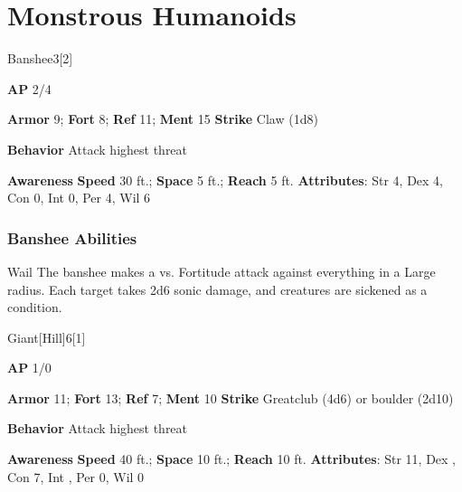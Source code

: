 \section{Monstrous Humanoids}
\begin{monsection}{Banshee}{3}[2]
\vspace{-1em}\vspace{-1em}
\begin{spellcontent}
\begin{spelltargetinginfo}
{\textbf{AP} 2/4}

\pari \textbf{Armor} 9;
\textbf{Fort} 8;
\textbf{Ref} 11;
\textbf{Ment} 15
\pari \textbf{Strike} Claw  (1d8)



\pari \textbf{Behavior} Attack highest threat
\end{spelltargetinginfo}
\end{spellcontent}

\begin{monsterfooter}
\pari \textbf{Awareness} 
\pari \textbf{Speed} 30 ft.;
\textbf{Space} 5 ft.;
\textbf{Reach} 5 ft.
\pari \textbf{Attributes}:
Str 4,
Dex 4,
Con 0,
Int 0,
Per 4,
Wil 6
\end{monsterfooter}
\end{monsection}


\subsubsection{Banshee Abilities}

\begin{freeability}{Wail}
The banshee makes a  vs. Fortitude attack against everything in a Large radius.
\hit Each target takes 2d6 sonic damage, and creatures are sickened as a condition.
\end{freeability}

\begin{monsection}{Giant}[Hill]{6}[1]
\vspace{-1em}\vspace{-1em}
\begin{spellcontent}
\begin{spelltargetinginfo}
{\textbf{AP} 1/0}

\pari \textbf{Armor} 11;
\textbf{Fort} 13;
\textbf{Ref} 7;
\textbf{Ment} 10
\pari \textbf{Strike} Greatclub  (4d6) or boulder  (2d10)



\pari \textbf{Behavior} Attack highest threat
\end{spelltargetinginfo}
\end{spellcontent}

\begin{monsterfooter}
\pari \textbf{Awareness} 
\pari \textbf{Speed} 40 ft.;
\textbf{Space} 10 ft.;
\textbf{Reach} 10 ft.
\pari \textbf{Attributes}:
Str 11,
Dex ,
Con 7,
Int ,
Per 0,
Wil 0
\end{monsterfooter}
\end{monsection}


